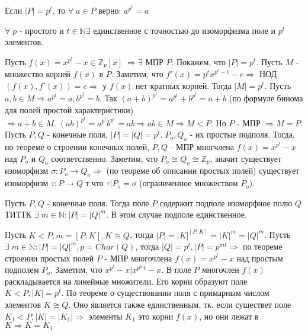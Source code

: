 \begin{sledsv}
  Если $|P| = p^t$, то $\forall\; a \in P$ верно: $a^{p^t} = a$
\end{sledsv}

\begin{proofs}
	$\forall\; p$ - простого и $t \in \mathbb{N} \exists$ единственное с точностью до изоморфизма поле и $p^t$ элементов.

  \begin{dokvo}
     Пусть $f(x) = x^{p^t} - x \in \mathbb{Z}_{p}[x]\; \Rightarrow \exists$ МПР $P$. Покажем, что $|P| = p^t$.
    Пусть $M$ - множество корней $f(x)$ в $P$. Заметим, что $f'(x) = p^t x^{p^t - 1} - e \Rightarrow$ НОД$(f(x),f'(x)) = e \Rightarrow$
    у $f(x)$ нет кратных корней. Тогда $|M| = p^t$. Пусть $a,b \in M \Rightarrow a^{p^t} = a; b^{p^t} = b$. Так $(a+b)^{p^t} = a^{p^t} + b^{p^t} = a+b$
    (по формуле бинома для полей простой характеристики) $\Rightarrow a+b \in M.\; (a b)^{p^t} = a^{p^t}  b^{p^t} = ab \Rightarrow ab \in M \Rightarrow M < P$.
    Но $P$ - МПР $\Rightarrow M = P$.
     Пусть $P, Q$ - конечные поля, $|P| = |Q| = p^t.\; P_o, Q_o$ - их простые подполя. Тогда, по теореме
    о строении конечных полей, $P, Q$ - МПР многчлена $f(x) = x^{p^t} - x$ над $P_o$ и $Q_o$ соответственно. Заметим, что $P_o \cong Q_o \cong \mathbb{Z}_p$,
    значит существует изоморфизм $\sigma : P_o \rightarrow Q_o \Rightarrow$ (по теореме об описании простых полей) существует изоморфизм $\tau : P \rightarrow Q$
    т.что $\tau | P_o = \sigma$ (ограниченное множеством $P_o$).
	\end{dokvo}
\end{proofs}

\begin{proofs}
	Пусть $P, Q$ - конечные поля. Тогда поле $P$ содержит подполе изоморфное полю $Q$ ТИТТК $\exists\; m \in \mathbb{N} : |P| = |Q|^m$. В этом случае подполе единственное.

  \begin{dokvo}
     Пусть $K < P, m = [P:K], K \cong Q$, тогда $|P| = |K|^{[P:K]} = |K|^m = |Q|^m$.
     Пусть $\exists\; m \in \mathbb{N} : |P| = |Q|^m, p = Char(Q)$, тогда $|Q| = p^t, |P| = p^{mt} \Rightarrow$
     по теореме строении простых полей $P$ - МПР многочлена $f(x) = x^{p^t} - x$ над простым подполем $P_o$. Заметим, что $x^{p^t} - x | x^{p^mt} - x$.
     В поле $P$ многочлен $f(x)$ раскладывается на линейные множители. Его корни образуют поле $K < P, |K| = p^t$. По теореме о существовании поля с примарным числом элементов
     $K \cong Q$. Оно является также единственным, тк, если существет поле $K_1 < P, |K| = |K_1| \Rightarrow$ элементы $K_1$ это корни $f(x)$, но они лежат в $K \Rightarrow K = K_1$  
	\end{dokvo}
\end{proofs}

